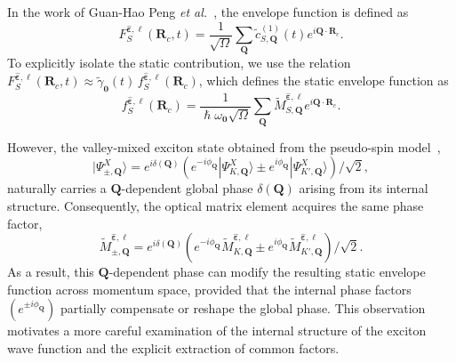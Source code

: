 In the work of Guan-Hao Peng \textit{et al.}~\cite{peng2022tailoring}, the envelope function is defined as
\begin{equation}
F_{S}^{\hat{\boldsymbol{\varepsilon}}, \ell}(\boldsymbol{R}_c,t)
=
\frac{1}{\sqrt{\Omega}}
\sum_{\boldsymbol{Q}}
\tilde{c}^{(1)}_{S,\boldsymbol{Q}}(t)
e^{i\boldsymbol{Q}\cdot\boldsymbol{R}_c}.
\label{wavepacket_envelope}
\end{equation}
To explicitly isolate the static contribution, we use the relation
$F_{S}^{\hat{\boldsymbol{\varepsilon}}, \ell}(\boldsymbol{R}_c,t)
\approx \tilde{\gamma}_{\boldsymbol{0}}(t)\, f_{S}^{\hat{\boldsymbol{\varepsilon}}, \ell}(\boldsymbol{R}_c)$,
which defines the static envelope function as
\begin{equation}
f_{S}^{\hat{\boldsymbol{\varepsilon}}, \ell}(\boldsymbol{R}_c)
=
\frac{1}{\hslash \omega_{\boldsymbol{0}} \sqrt{\Omega}}
\sum_{\boldsymbol{Q}}
\tilde{M}^{\hat{\boldsymbol{\varepsilon}}, \ell}_{S,\boldsymbol{Q}}
e^{i\boldsymbol{Q}\cdot\boldsymbol{R}_c}.
\label{wavepacket_static}
\end{equation}

However, the valley-mixed exciton state obtained from the pseudo-spin model~\cite{peng2022tailoring},
\begin{equation}
|\Psi^{X}_{\pm,\boldsymbol{Q}}\rangle
=
e^{i\delta(\boldsymbol{Q})}
\left(
e^{-i\phi_{\boldsymbol{Q}}}
|\Psi^{X}_{K,\boldsymbol{Q}}\rangle
\pm
e^{i\phi_{\boldsymbol{Q}}}
|\Psi^{X}_{K',\boldsymbol{Q}}\rangle
\right) / \sqrt{2},
\label{global_phase1}
\end{equation}
naturally carries a $\boldsymbol{Q}$-dependent global phase $\delta(\boldsymbol{Q})$ arising from its internal structure. Consequently, the optical matrix element acquires the same phase factor,
\begin{equation}
\tilde{M}^{\hat{\boldsymbol{\varepsilon}}, \ell}_{\pm,\boldsymbol{Q}}
=
e^{i\delta(\boldsymbol{Q})}
\left(
e^{-i\phi_{\boldsymbol{Q}}}
\tilde{M}^{\hat{\boldsymbol{\varepsilon}}, \ell}_{K,\boldsymbol{Q}}
\pm
e^{i\phi_{\boldsymbol{Q}}}
\tilde{M}^{\hat{\boldsymbol{\varepsilon}}, \ell}_{K',\boldsymbol{Q}}
\right) / \sqrt{2}.
\label{global_phase}
\end{equation}
As a result, this $\boldsymbol{Q}$-dependent phase can modify the resulting static envelope function across momentum space, provided that the internal phase factors $(e^{\pm i \phi_{\boldsymbol{Q}}})$ partially compensate or reshape the global phase. This observation motivates a more careful examination of the internal structure of the exciton wave function and the explicit extraction of common factors.

